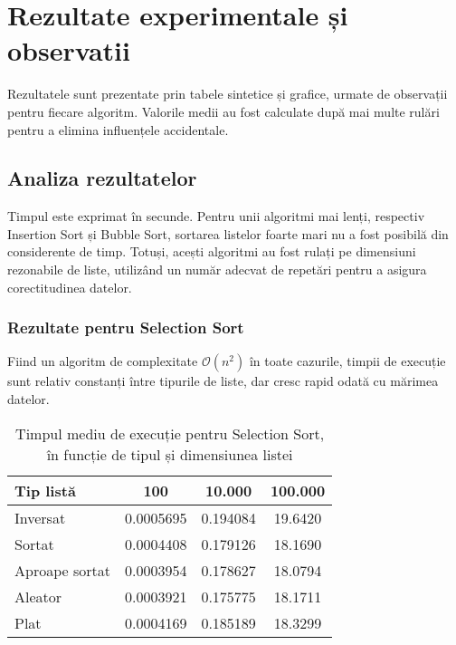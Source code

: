 \documentclass{article}
\begin{document}
\section{Rezultate experimentale și observatii}
Rezultatele sunt prezentate prin tabele sintetice și grafice, urmate de observații pentru fiecare algoritm. Valorile medii au fost calculate după mai multe rulări pentru a elimina influențele accidentale.


\subsection{Analiza rezultatelor}
Timpul este exprimat în secunde. Pentru unii algoritmi mai lenți, respectiv Insertion Sort și Bubble Sort, sortarea listelor foarte mari nu a fost posibilă din considerente de timp. Totuși, acești algoritmi au fost rulați pe dimensiuni rezonabile de liste, utilizând un număr adecvat de repetări pentru a asigura corectitudinea datelor.

\subsubsection*{Rezultate pentru Selection Sort}
Fiind un algoritm de complexitate $\mathcal{O}(n^2)$ în toate cazurile, timpii de execuție sunt relativ constanți între tipurile de liste, dar cresc rapid odată cu mărimea datelor.

\begin{table}[H]
\centering
\begin{tabular}{|l|c|c|c|}
\hline
\textbf{Tip listă} & \textbf{100} & \textbf{10.000} & \textbf{100.000} \\
\hline
Inversat & 0.0005695 & 0.194084 & 19.6420 \\
\hline
Sortat & 0.0004408 & 0.179126 & 18.1690 \\
\hline
Aproape sortat & 0.0003954 & 0.178627 & 18.0794 \\
\hline
Aleator & 0.0003921 & 0.175775 & 18.1711 \\
\hline
Plat & 0.0004169 & 0.185189 & 18.3299 \\
\hline
\end{tabular}
\caption{Timpul mediu de execuție pentru Selection Sort, în funcție de tipul și dimensiunea listei}
\label{tab:rezultate-selection}
\end{table}
\end{document}

